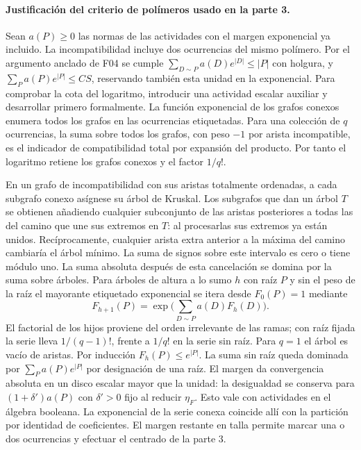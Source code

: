 \paragraph{Justificación del criterio de polímeros usado en la parte 3.}
Sean $a(P)\ge0$ las normas de las actividades con el margen exponencial ya incluido.
La incompatibilidad incluye dos ocurrencias del mismo polímero. Por el argumento
anclado de F04 se cumple $\sum_{D\sim P}a(D)e^{|D|}\le |P|$ con holgura,
y $\sum_P a(P)e^{|P|}\le CS$, reservando también esta unidad en la exponencial.
Para comprobar la cota del logaritmo, introducir una actividad escalar auxiliar
y desarrollar primero formalmente. La función exponencial de los grafos conexos
enumera todos los grafos en las ocurrencias etiquetadas. Para una colección de $q$
ocurrencias, la suma sobre todos los grafos, con peso $-1$ por arista incompatible,
es el indicador de compatibilidad total por expansión del producto.
Por tanto el logaritmo retiene los grafos conexos y el factor $1/q!$.

En un grafo de incompatibilidad con sus aristas totalmente ordenadas, a cada subgrafo
conexo asígnese su árbol de Kruskal. Los subgrafos que dan un árbol $T$ se obtienen
añadiendo cualquier subconjunto de las aristas posteriores a todas las del camino
que une sus extremos en $T$: al procesarlas sus extremos ya están unidos.
Recíprocamente, cualquier arista extra anterior a la máxima del camino cambiaría
el árbol mínimo. La suma de signos sobre este intervalo es cero o tiene módulo uno.
La suma absoluta después de esta cancelación se domina por la suma sobre árboles.
Para árboles de altura a lo sumo $h$ con raíz $P$ y sin el peso de la raíz
el mayorante etiquetado exponencial se itera desde $F_0(P)=1$ mediante
\[
 F_{h+1}(P)=\exp\Big(\sum_{D\sim P}a(D)F_h(D)\Big).
\]
El factorial de los hijos proviene del orden irrelevante de las ramas; con raíz fijada
la serie lleva $1/(q-1)!$, frente a $1/q!$ en la serie sin raíz. Para $q=1$ el árbol es vacío de aristas.
Por inducción $F_h(P)\le e^{|P|}$. La suma sin raíz queda dominada por
$\sum_P a(P)e^{|P|}$ por designación de una raíz. El margen da convergencia
absoluta en un disco escalar mayor que la unidad: la desigualdad se conserva para
$(1+\delta')a(P)$ con $\delta'>0$ fijo al reducir $\eta_F$. Esto vale con actividades en
el álgebra booleana. La exponencial de la serie conexa coincide allí con la
partición por identidad de coeficientes. El margen restante en talla permite
marcar una o dos ocurrencias y efectuar el centrado de la parte 3.
